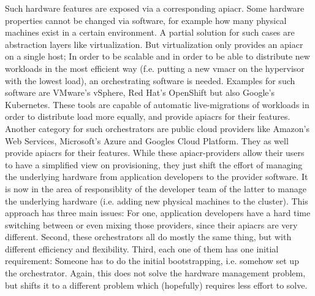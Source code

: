 
Such hardware features are exposed via a corresponding \gls{apiacr}. Some hardware properties cannot be changed via software, for example how many physical machines exist in a certain environment. A partial solution for such cases are abstraction layers like virtualization.
\newline
But virtualization only provides an \gls{apiacr} on a single host; In order to be scalable and in order to be able to distribute new workloads in the most efficient way (f.e. putting a new \gls{vmacr} on the hypervisor with the lowest load), an orchestrating software is needed. Examples for such software are VMware's vSphere, Red Hat's OpenShift but also Google's Kubernetes.
\newline
These tools are capable of automatic live-migrations of workloads in order to distribute load more equally, and provide \gls{apiacr}s for their features. 
\newline
Another category for such orchestrators are public cloud providers like Amazon's Web Services, Microsoft's Azure and Googles Cloud Platform. They as well provide \gls{apiacr}s for their features.
\newline
While these \gls{apiacr}-providers allow their users to have a simplified view on provisioning, they just shift the effort of managing the underlying hardware from application developers to the provider software. It is now in the area of responsiblity of the developer team of the latter to manage the underlying hardware (i.e. adding new physical machines to the cluster).
\newline
This approach has three main issues: For one, application developers have a hard time switching between or even mixing those providers, since their \gls{apiacr}s are very different. Second, these orchestrators all do mostly the same thing, but with different efficiency and flexibility. Third, each one of them has one initial requirement: Someone has to do the initial bootstrapping, i.e. somehow set up the orchestrator. Again, this does not solve the hardware management problem, but shifts it to a different problem which (hopefully) requires less effort to solve.
